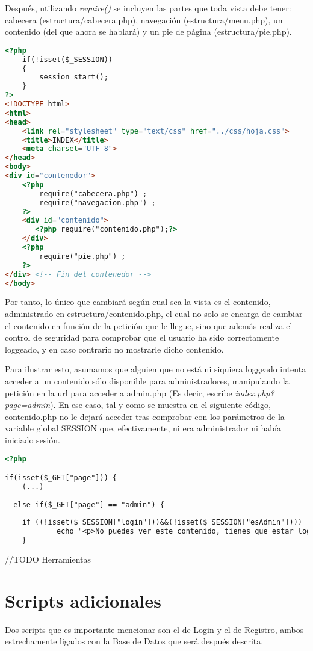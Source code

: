 \documentclass[12pt]{report}
\begin{document}
Después, utilizando \textit{require()} se incluyen las partes que toda vista debe tener: cabecera (estructura/cabecera.php), navegación (estructura/menu.php), un contenido (del que ahora se hablará) y  un pie de página (estructura/pie.php).
\newline
\begin{lstlisting}[language=HTML]
<?php
    if(!isset($_SESSION)) 
    { 
        session_start(); 
    } 
?>
<!DOCTYPE html>
<html>
<head>
    <link rel="stylesheet" type="text/css" href="../css/hoja.css">
    <title>INDEX</title>
    <meta charset="UTF-8">
</head>
<body>
<div id="contenedor">
    <?php 
        require("cabecera.php") ;
	 	require("navegacion.php") ;
	?>
	<div id="contenido">
	   <?php require("contenido.php");?>
	</div>
	<?php 
	 	require("pie.php") ;
	?>
</div> <!-- Fin del contenedor -->
</body>
\end{lstlisting}

Por tanto, lo único que cambiará según cual sea la vista es el contenido, administrado en estructura/contenido.php, el cual no solo se encarga de cambiar el contenido en función de la petición que le llegue, sino que además realiza el control de seguridad para comprobar que el usuario ha sido correctamente loggeado, y en caso contrario no mostrarle dicho contenido.

Para ilustrar esto, asumamos que alguien que no está ni siquiera loggeado intenta acceder a un contenido sólo disponible para administradores, manipulando la petición en la url para acceder a admin.php (Es decir, escribe \textit{index.php?page=admin}). En ese caso, tal y como se muestra en el siguiente código, contenido.php no le dejará acceder tras comprobar con los parámetros de la variable global SESSION que, efectivamente, ni era administrador ni había iniciado sesión.
\newline
\begin{lstlisting}[language=HTML]
<?php 

if(isset($_GET["page"])) {
    (...)
    
  else if($_GET["page"] == "admin") {
    
    if ((!isset($_SESSION["login"]))&&(!isset($_SESSION["esAdmin"]))) {
            echo "<p>No puedes ver este contenido, tienes que estar loggeado y ser Administrador para visualizarlo.</p>";
    }
\end{lstlisting}
//TODO Herramientas
 \newpage
\section{Scripts adicionales}
Dos scripts que es importante mencionar son el de Login y el de Registro, ambos estrechamente ligados con la Base de Datos que será después descrita. 
\end{document}
